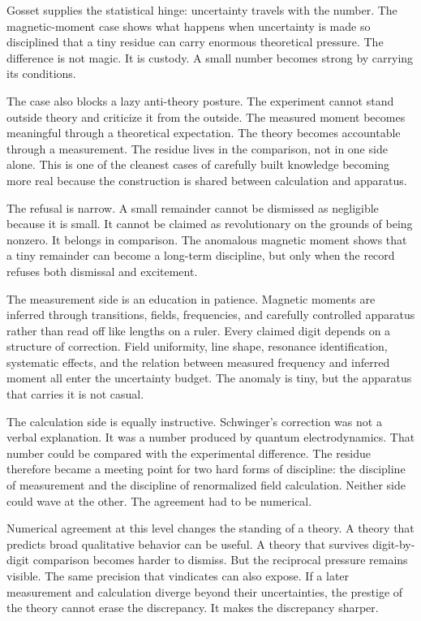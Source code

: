 Gosset supplies the statistical hinge: uncertainty travels with the number.
The magnetic-moment case shows what happens when uncertainty is made so
disciplined that a tiny residue can carry enormous theoretical pressure. The difference is not magic.
It is custody. A small number becomes strong by carrying its conditions.

The case also blocks a lazy anti-theory posture. The experiment cannot stand
outside theory and criticize it from the outside. The measured moment becomes
meaningful through a theoretical expectation. The theory becomes accountable
through a measurement. The residue lives in the comparison, not in one side
alone. This is one of the cleanest cases of carefully built knowledge becoming
more real because the construction is shared between calculation and
apparatus.

The refusal is narrow. A small remainder cannot be dismissed as negligible
because it is small. It cannot be claimed as revolutionary on the grounds of
being nonzero. It belongs in comparison. The anomalous magnetic moment shows
that a tiny remainder can become a long-term discipline, but only when the
record refuses both dismissal and excitement.

The measurement side is an education in patience. Magnetic moments are
inferred through transitions, fields, frequencies, and carefully controlled
apparatus rather than read off like lengths on a ruler. Every claimed digit
depends on a structure of correction. Field uniformity, line shape, resonance
identification, systematic effects, and the relation between measured
frequency and inferred moment all enter the uncertainty budget. The anomaly
is tiny, but the apparatus that carries it is not casual.

The calculation side is equally instructive. Schwinger's correction was not
a verbal explanation. It was a number produced by quantum electrodynamics.
That number could be compared with the experimental difference. The residue
therefore became a meeting point for two hard forms of discipline: the
discipline of measurement and the discipline of renormalized field
calculation. Neither side could wave at the other. The agreement had to be
numerical.

Numerical agreement at this level changes the standing of a theory. A theory
that predicts broad qualitative behavior can be useful. A theory that
survives digit-by-digit comparison becomes harder to dismiss. But the
reciprocal pressure remains visible. The same precision that vindicates
can also expose. If a later measurement and calculation diverge beyond their
uncertainties, the prestige of the theory cannot erase the discrepancy. It
makes the discrepancy sharper.

